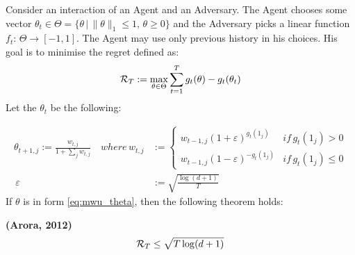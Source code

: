Consider an interaction of an Agent and an Adversary. The Agent chooses some vector $\theta_t \in \Theta =  \{\theta \, | \, \|\theta\|_1 \leq 1, \, \theta \geq 0\}$ and the Adversary picks a linear function $f_t: \, \Theta \to [-1, 1]$. The Agent may use only previous history in his choices. His goal is to minimise the regret defined as: 
    \[
        \operatorname{\mathcal{R}}_{T} := \max_{\theta \in \Theta} \sum_{t = 1}^T g_t(\theta) - g_t(\theta_t)
    \]
    Let the $\theta_t$ be the following:
    
    \begin{equation}
        \label{eq:mwu_theta}
        \begin{split}
            \theta_{t+1, j} := \frac{w_{t, j}}{1 + \sum_{j}w_{t,j}}\quad where  \, w_{t, j} &:= \begin{cases}
                    w_{t-1, j}(1 + \varepsilon)^{g_t(1_j)} & if\, g_t(1_j) > 0 \\
                    w_{t-1, j}(1 - \varepsilon)^{-g_t(1_j)} & if\, g_t(1_j) \leq 0
                    \end{cases}\\
             \, \varepsilon &:= \sqrt{\frac{\log(d+1)}{T}}
        \end{split}
    \end{equation}
    If $\theta$ is in form \ref{eq:mwu_theta}, then the following theorem \cite{Arora2012} holds:
    
\begin{theorem} \textbf{(Arora, 2012)}
    \[
        \operatorname{\mathcal{R}}_T \leq  \sqrt{T\log(d+1)}
    \]
\end{theorem}

